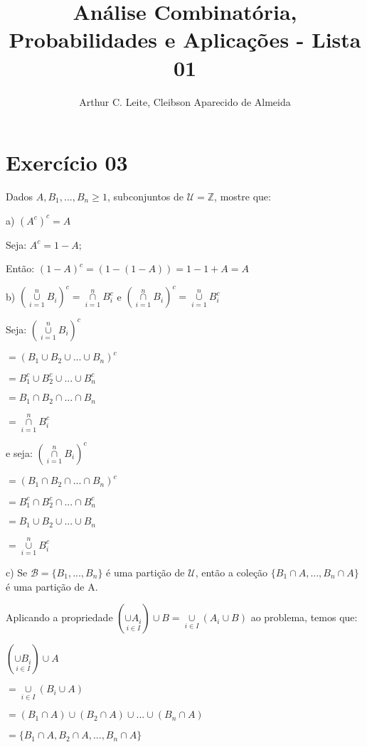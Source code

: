 \documentclass[12pt]{article}
\title{Análise Combinatória, Probabilidades e Aplicações - Lista 01}
\author{{Arthur C. Leite}, {Cleibson Aparecido de Almeida}}
\begin{document}
\maketitle

\section*{Exercício 03}

Dados $A, B_1, ... , B_n \geq 1$, subconjuntos de $\mathcal{U} = \mathbb{Z}$, mostre que:

a) $(A^c)^c = A$

Seja: $A^c = 1-A$;

Então: $(1-A)^c = (1-(1-A)) = 1-1+A = A$

\bigskip

b) $(\overset{n}{\underset{i=1}{\cup}} B_i)^c = \overset{n}{\underset{i=1}{\cap}} B_i^c$ e $(\overset{n}{\underset{i=1}{\cap}} B_i)^c = \overset{n}{\underset{i=1}{\cup}} B_i^c$

Seja: $(\overset{n}{\underset{i=1}{\cup}} B_i)^c$

$= (B_1 \cup B_2 \cup ... \cup B_n)^c$

$= B_1^c \cup B_2^c \cup ... \cup B_n^c$

$= B_1 \cap B_2 \cap ... \cap B_n$

$= \overset{n}{\underset{i=1}{\cap}} B_i^c$

e seja: $(\overset{n}{\underset{i=1}{\cap}} B_i)^c$

$= (B_1 \cap B_2 \cap ... \cap B_n)^c$

$= B_1^c \cap B_2^c \cap ... \cap B_n^c$

$= B_1 \cup B_2 \cup ... \cup B_n$

$= \overset{n}{\underset{i=1}{\cup}} B_i^c$

\bigskip

c) Se $\mathcal{B}=\{B_1,...,B_n\}$ é uma partição de $\mathcal{U}$, então a coleção $\{B_1 \cap A, ..., B_n \cap A\}$ é uma partição de A.

Aplicando a propriedade $(\underset{i \in I}{\cup A_i}) \cup B = \underset{i \in I}{\cup} (A_i \cup B)$ ao problema, temos que:

$(\underset{i \in I}{\cup B_i}) \cup A$

$= \underset{i \in I}{\cup} (B_i \cup A)$

$=(B_1 \cap A) \cup (B_2 \cap A) \cup ... \cup (B_n \cap A)$

$=\{B_1 \cap A, B_2 \cap A, ... , B_n \cap A\}$
\end{document}
